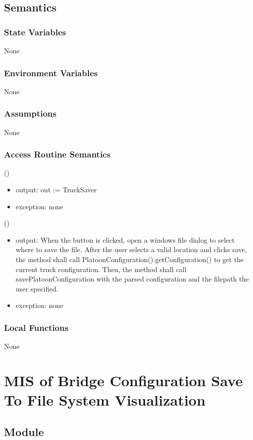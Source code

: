 \documentclass[12pt, titlepage]{article}
\begin{document}
\subsection{Semantics}

\subsubsection{State Variables}
None
\subsubsection{Environment Variables}
None
\subsubsection{Assumptions}
None
\subsubsection{Access Routine Semantics}

()
\begin{itemize}
\item output: out := TruckSaver
\item exception: none
\end{itemize}

()
\begin{itemize}
\item output: When the button is clicked, open a windows file dialog to select where to save the file. After the user selects a valid location and clicks save, the method shall call PlatoonConfiguration().getConfiguration() to get the current truck configuration. Then, the method shall call savePlatoonConfiguration with the parsed configuration and the filepath the user specified.
\item exception: none
\end{itemize}

\subsubsection{Local Functions}
None
\newpage
\section{MIS of Bridge Configuration Save To File System Visualization} \label{BridgeSaver}

\subsection{Module}
\end{document}
